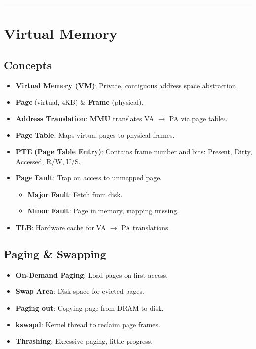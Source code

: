 \documentclass[8pt,a4paper]{article}
\newcommand{\sectiondivider}{\vspace{4pt}\hrule\vspace{4pt}}
\begin{document}
\begin{multicols}{2}
\sectiondivider
\section*{Virtual Memory}
\subsection*{Concepts}
\begin{itemize}
    \item \textbf{Virtual Memory (VM)}: Private, contiguous address space abstraction.
    \item \textbf{Page} (virtual, 4KB) \& \textbf{Frame} (physical).
    \item \textbf{Address Translation}: \textbf{MMU} translates VA $\to$ PA via page tables.
    \item \textbf{Page Table}: Maps virtual pages to physical frames.
    \item \textbf{PTE (Page Table Entry)}: Contains frame number and bits: Present, Dirty, Accessed, R/W, U/S.
    \item \textbf{Page Fault}: Trap on access to unmapped page.
        \begin{itemize}
            \item \textbf{Major Fault}: Fetch from disk.
            \item \textbf{Minor Fault}: Page in memory, mapping missing.
        \end{itemize}
    \item \textbf{TLB}: Hardware cache for VA $\to$ PA translations.
\end{itemize}

\subsection*{Paging \& Swapping}
\begin{itemize}
    \item \textbf{On-Demand Paging}: Load pages on first access.
    \item \textbf{Swap Area}: Disk space for evicted pages.
    \item \textbf{Paging out}: Copying page from DRAM to disk.
    \item \textbf{kswapd}: Kernel thread to reclaim page frames.
    \item \textbf{Thrashing}: Excessive paging, little progress.
\end{itemize}


\end{multicols}
\end{document}
